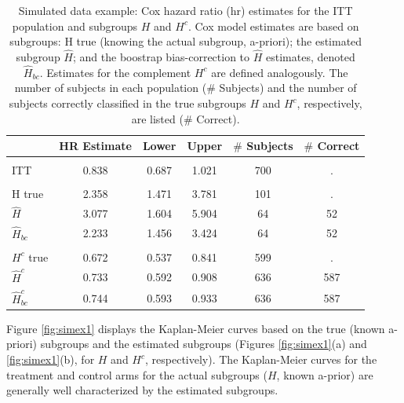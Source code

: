 \documentclass[smallextended]{svjour3}
\begin{document}
\begin{table}[!h]

\caption{\label{tab:simex1_tab}\label{tab:simex1} Simulated data example: Cox hazard ratio (hr) estimates for the ITT population and subgroups $H$ and $H^{c}$.
Cox model estimates are based on subgroups: H true (knowing the actual subgroup, a-priori); the estimated subgroup $\hat{H}$; and 
the boostrap bias-correction to $\hat{H}$ estimates, denoted $\hat{H}_{bc}$.  Estimates for the complement $H^{c}$ are defined analogously.
The number of subjects in each population ($\#$ Subjects) and the number of subjects correctly classified in the true subgroups $H$ and $H^{c}$, respectively, are listed ($\#$ Correct).}
\centering
\fontsize{9}{11}\selectfont
\begin{tabular}[t]{lccccc}
\toprule
  & HR Estimate & Lower & Upper & $\#$ Subjects & $\#$ Correct\\
\midrule
\addlinespace[0.3em]
\multicolumn{6}{l}{\textbf{ITT}}\\
\hspace{1em}ITT & 0.838 & 0.687 & 1.021 & 700 & .\\
\addlinespace[0.3em]
\multicolumn{6}{l}{\textbf{H subgroup estimates}}\\
\hspace{1em}H true & 2.358 & 1.471 & 3.781 & 101 & .\\
\hspace{1em}$\hat{H}$ & 3.077 & 1.604 & 5.904 & 64 & 52\\
\hspace{1em}$\hat{H}_{bc}$ & 2.233 & 1.456 & 3.424 & 64 & 52\\
\addlinespace[0.3em]
\multicolumn{6}{l}{\textbf{H-complement subgroup estimates}}\\
\hspace{1em}$H^{c}$ true & 0.672 & 0.537 & 0.841 & 599 & .\\
\hspace{1em}$\hat{H}^{c}$ & 0.733 & 0.592 & 0.908 & 636 & 587\\
\hspace{1em}$\hat{H}^{c}_{bc}$ & 0.744 & 0.593 & 0.933 & 636 & 587\\
\bottomrule
\end{tabular}
\end{table}




Figure \ref{fig:simex1} displays the Kaplan-Meier curves based on the true (known a-priori) subgroups and the estimated subgroups (Figures \ref{fig:simex1}(a) and \ref{fig:simex1}(b), for $H$ and $H^{c}$, respectively).  The Kaplan-Meier curves for the treatment and control arms for the actual subgroups ($H$, known a-prior) are generally well characterized by the estimated subgroups.  
\end{document}
